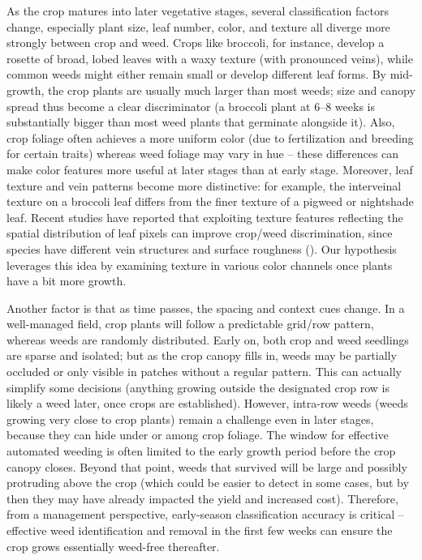 \documentclass[letterpaper, notitlepage]{report}
\begin{document}
As the crop matures into later vegetative stages, several classification factors change, especially plant size, leaf number, color, and texture all diverge more strongly between crop and weed. Crops like broccoli, for instance, develop a rosette of broad, lobed leaves with a waxy texture (with pronounced veins), while common weeds might either remain small or develop different leaf forms. By mid-growth, the crop plants are usually much larger than most weeds; size and canopy spread thus become a clear discriminator (a broccoli plant at 6–8 weeks is substantially bigger than most weed plants that germinate alongside it). Also, crop foliage often achieves a more uniform color (due to fertilization and breeding for certain traits) whereas weed foliage may vary in hue – these differences can make color features more useful at later stages than at early stage. Moreover, leaf texture and vein patterns become more distinctive: for example, the interveinal texture on a broccoli leaf differs from the finer texture of a pigweed or nightshade leaf. Recent studies have reported that exploiting texture features reflecting the spatial distribution of leaf pixels can improve crop/weed discrimination, since species have different vein structures and surface roughness (\cite{Garibaldi-Marquez2022-yn}). Our hypothesis leverages this idea by examining texture in various color channels once plants have a bit more growth.

Another factor is that as time passes, the spacing and context cues change. In a well-managed field, crop plants will follow a predictable grid/row pattern, whereas weeds are randomly distributed. Early on, both crop and weed seedlings are sparse and isolated; but as the crop canopy fills in, weeds may be partially occluded or only visible in patches without a regular pattern. This can actually simplify some decisions (anything growing outside the designated crop row is likely a weed later, once crops are established). However, intra-row weeds (weeds growing very close to crop plants) remain a challenge even in later stages, because they can hide under or among crop foliage. The window for effective automated weeding is often limited to the early growth period before the crop canopy closes. Beyond that point, weeds that survived will be large and possibly protruding above the crop (which could be easier to detect in some cases, but by then they may have already impacted the yield and increased cost). Therefore, from a management perspective, early-season classification accuracy is critical – effective weed identification and removal in the first few weeks can ensure the crop grows essentially weed-free thereafter.
\end{document}
